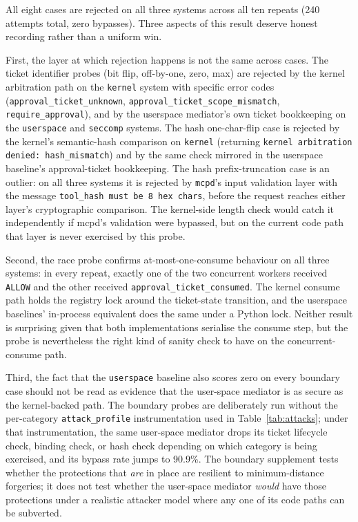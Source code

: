All eight cases are rejected on all three systems across all ten repeats (240 attempts total, zero bypasses). Three aspects of this result deserve honest recording rather than a uniform win.

First, the layer at which rejection happens is not the same across cases. The ticket identifier probes (bit flip, off-by-one, zero, max) are rejected by the kernel arbitration path on the \texttt{kernel} system with specific error codes (\texttt{approval\_ticket\_unknown}, \texttt{approval\_ticket\_scope\_mismatch}, \texttt{require\_approval}), and by the userspace mediator's own ticket bookkeeping on the \texttt{userspace} and \texttt{seccomp} systems. The hash one-char-flip case is rejected by the kernel's semantic-hash comparison on \texttt{kernel} (returning \texttt{kernel arbitration denied: hash\_mismatch}) and by the same check mirrored in the userspace baseline's approval-ticket bookkeeping. The hash prefix-truncation case is an outlier: on all three systems it is rejected by \texttt{mcpd}'s input validation layer with the message \texttt{tool\_hash must be 8 hex chars}, before the request reaches either layer's cryptographic comparison. The kernel-side length check would catch it independently if mcpd's validation were bypassed, but on the current code path that layer is never exercised by this probe.

Second, the race probe confirms at-most-one-consume behaviour on all three systems: in every repeat, exactly one of the two concurrent workers received \texttt{ALLOW} and the other received \texttt{approval\_ticket\_consumed}. The kernel consume path holds the registry lock around the ticket-state transition, and the userspace baselines' in-process equivalent does the same under a Python lock. Neither result is surprising given that both implementations serialise the consume step, but the probe is nevertheless the right kind of sanity check to have on the concurrent-consume path.

Third, the fact that the \texttt{userspace} baseline also scores zero on every boundary case should not be read as evidence that the user-space mediator is as secure as the kernel-backed path. The boundary probes are deliberately run without the per-category \texttt{attack\_profile} instrumentation used in Table~\ref{tab:attacks}; under that instrumentation, the same user-space mediator drops its ticket lifecycle check, binding check, or hash check depending on which category is being exercised, and its bypass rate jumps to 90.9\%. The boundary supplement tests whether the protections that \emph{are} in place are resilient to minimum-distance forgeries; it does not test whether the user-space mediator \emph{would} have those protections under a realistic attacker model where any one of its code paths can be subverted.

